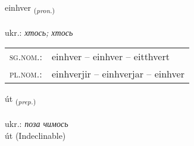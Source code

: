 \documentclass[frontgrid, backgrid]{flacards}\usepackage[]{graphicx}\usepackage[]{xcolor}
\begin{document}
\renewcommand{\flhead}{\vskip5pt \fboxsep=0pt {\small\bfseries\footnotesize Fornafn | займенник}}
\renewcommand{\fcfoot}{\vskip5pt \fboxsep=0pt \hspace{2pt}{\small\bfseries\footnotesize 1K}}

\renewcommand{\blhead}{\vskip5pt {\small\bfseries\footnotesize Fornafn | займенник }}
\renewcommand{\bcfoot}{\vskip5pt \hspace{2pt}{\small\bfseries\footnotesize 1K}}


{einhver \small{\textsubscript{(\textit{pron.})}} \\[1ex] %
 \\
ukr.: \emph{хтось; хтось} \\  [2ex]
\renewcommand*{\arraystretch}{0.8}
\begin{tabular}{ll}
\textsc{sg.nom.}: & einhver  --  einhver -- eitthvert \\ 
\textsc{pl.nom.}: & einhverjir -- einhverjar -- einhver
\end{tabular}
}


\renewcommand{\flhead}{\vskip5pt \fboxsep=0pt {\small\bfseries\footnotesize Forsetning | прийменник}}
\renewcommand{\fcfoot}{\vskip5pt \fboxsep=0pt \hspace{2pt}{\small\bfseries\footnotesize 1K}}

\renewcommand{\blhead}{\vskip5pt {\small\bfseries\footnotesize Forsetning | прийменник }}
\renewcommand{\bcfoot}{\vskip5pt \hspace{2pt}{\small\bfseries\footnotesize 1K}}


{út \small{\textsubscript{(\textit{prep.})}} \\[1ex]
\textphonetic{[uːt]} \\
ukr.: \emph{поза чимось} \\  [2ex]
út (Indeclinable)}

\renewcommand{\flhead}{\vskip5pt \fboxsep=0pt {\small\bfseries\footnotesize Sagnorð | дієслово}}
\renewcommand{\fcfoot}{\vskip5pt \fboxsep=0pt \hspace{2pt}{\small\bfseries\footnotesize 1K}}
\end{document}
